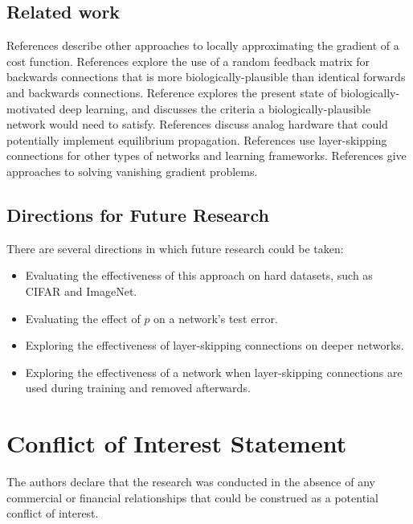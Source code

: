 \documentclass[utf8]{frontiersSCNS}
\begin{document}
\subsection{Related work}

References \citep{lee2015, xie2003, pineda1987} describe other approaches to locally approximating the gradient of a cost function. References \citep{lillicrap2014, crafton2019} explore the use of a random feedback matrix for backwards connections that is more biologically-plausible than identical forwards and backwards connections. Reference \citep{bartunov2018} explores the present state of biologically-motivated deep learning, and \citep{bengio2015} discusses the criteria a biologically-plausible network would need to satisfy. References \citep{shainline2019, davies2018, nahmias2013} discuss analog hardware that could potentially implement equilibrium propagation. References \citep{he2015, srivastava2015, xiaohu2011, krishnan2019} use layer-skipping connections for other types of networks and learning frameworks. References \citep{ioffe2015, glorot2010} give approaches to solving vanishing gradient problems.

\subsection{Directions for Future Research}

There are several directions in which future research could be taken:
\begin{itemize} 
\item Evaluating the effectiveness of this approach on hard datasets, such as CIFAR and ImageNet.
\item Evaluating the effect of $p$ on a network's test error.
\item Exploring the effectiveness of layer-skipping connections on deeper networks.
\item Exploring the effectiveness of a network when layer-skipping connections are used during training and removed afterwards.
\end{itemize}

\section*{Conflict of Interest Statement}

The authors declare that the research was conducted in the absence of any commercial or financial relationships that could be construed as a potential conflict of interest.
\end{document}
